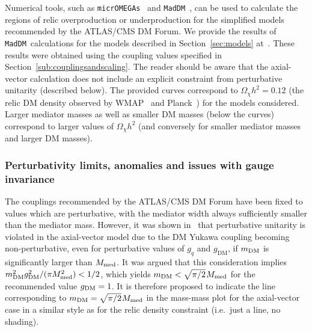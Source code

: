 Numerical tools, such as {\tt micrOMEGAs}~\cite{Belanger:2014vza} and {\tt MadDM}~\cite{Backovic:2015cra}, can be used to calculate the regions of relic overproduction or underproduction for the simplified models recommended by the ATLAS/CMS DM Forum. We provide the results of {\tt MadDM}~calculations for the models described in Section~\ref{sec:models} at~\cite{relic_results}.  These results were obtained using the coupling values specified in Section~\ref{sub:couplingsandscaling}.  The reader should be aware that the axial-vector calculation does not include an explicit constraint from perturbative unitarity (described below).  The provided curves correspond to $\Omega_{\chi}h^{2}=0.12$ (the relic DM density observed by WMAP~\cite{Hinshaw:2012aka} and Planck~\cite{Ade:2015xua}) for the models considered.  Larger mediator masses as well as smaller DM masses (below the curves) correspond to larger values of $\Omega_{\chi}h^{2}$ (and conversely for smaller mediator masses and larger DM masses).


\subsubsection{Perturbativity limits, anomalies and issues with gauge invariance}
\label{sub:perturbativitylimit}


The couplings recommended by the ATLAS/CMS DM Forum have been fixed to values which are perturbative, with the mediator width always sufficiently smaller than the mediator mass. However, it was shown in~\cite{Chala:2015ama, Kahlhoefer:2015bea} that perturbative unitarity is violated in the axial-vector model due to the DM Yukawa coupling becoming non-perturbative, even for perturbative values of $g_q$ and $g_\text{DM}$, if $m_{\rm{DM}}$ is significantly larger than $M_{\rm{med}}$.  It was argued that this consideration implies $m_\text{DM}^2 g_{\rm{DM}}^2 / (\pi M_{\rm{med}}^2) < 1/2$,
which yields $m_\text{DM} < \sqrt{\pi / 2} \hspace{0.25mm} M_{\rm{med}}$ for the recommended value $g_{\rm{DM}} = 1$. It is therefore proposed to indicate the line corresponding to $m_{\rm{DM}} = \sqrt{\pi / 2} \hspace{0.25mm} M_{\rm{med}}$ in the mass-mass plot for the axial-vector case in a similar style as for the relic density constraint (i.e.~just a line, no shading). 



